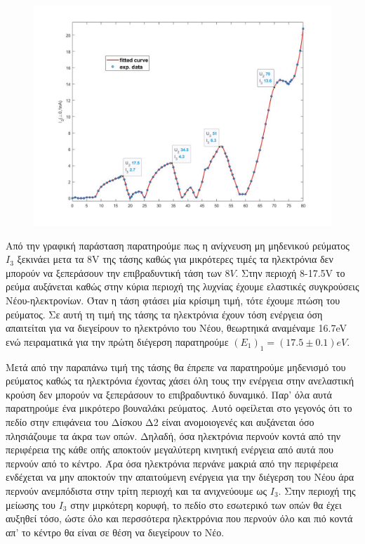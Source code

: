 \documentclass[a4paper]{article}
\begin{document}
	\begin{figure}[h!]
		\centering
		\includegraphics[width=1.2\linewidth]{plot2.jpg}
		\caption{ }
		\label{im2}
	\end{figure}
	
	Από την γραφική παράσταση παρατηρούμε πως η ανίχνευση μη μηδενικού ρεύματος $I_3$ ξεκινάει μετα τα 8V της τάσης καθώς για μικρότερες τιμές τα ηλεκτρόνια δεν μπορούν να ξεπεράσουν την επιβραδυντική τάση των $8V$. Στην περιοχή 8-17.5V το ρεύμα αυξάνεται καθώς στην κύρια περιοχή της λυχνίας έχουμε ελαστικές συγκρούσεις Νέου-ηλεκτρονίων. Όταν η τάση φτάσει μία κρίσιμη τιμή, τότε έχουμε πτώση του ρεύματος. Σε αυτή τη τιμή της τάσης τα ηλεκτρόνια έχουν τόση ενέργεια όση απαιτείται για να διεγείρουν το ηλεκτρόνιο του Νέου, θεωρτηικά αναμέναμε 16.7eV ενώ πειραματικά για την πρώτη διέγερση παρατηρούμε $(E_1)_1 = (17.5\pm0.1)eV$.
	
	Μετά από την παραπάνω τιμή της τάσης θα έπρεπε να παρατηρούμε μηδενισμό του ρεύματος καθώς τα ηλεκτρόνια έχοντας χάσει όλη τους την ενέργεια στην ανελαστική κρούση δεν μπορούν να ξεπεράσουν το επιβραδυντικό δυναμικό. Παρ' όλα αυτά παρατηρούμε ένα μικρότερο βουναλάκι ρεύματος. Αυτό οφείλεται στο γεγονός ότι το πεδίο στην επιφάνεια του Δίσκου Δ2 είναι ανομοιογενές και αυξάνεται όσο πλησιάζουμε τα άκρα των οπών. Δηλαδή, όσα ηλεκτρόνια περνούν κοντά από την περιφέρεια της κάθε οπής αποκτούν μεγαλύτερη κινητική ενέργεια από αυτά που περνούν από το κέντρο. Άρα όσα ηλεκτρόνια περνάνε μακριά από την περιφέρεια ενδέχεται να μην αποκτούν την απαιτούμενη ενέργεια για την διέγερση του Νέου άρα περνούν ανεμπόδιστα στην τρίτη περιοχή και τα ανιχνεύουμε ως $I_3$. Στην περιοχή της μείωσης του $I_3$ στην μιρκότερη κορυφή, το πεδίο στο εσωτερικό των οπών θα έχει αυξηθεί τόσο, ώστε όλο και περσσότερα ηλεκτρρόνια που περνούν όλο και πιό κοντά απ' το κέντρο θα είναι σε θέση να διεγείρουν το Νέο.
	
\end{document}
